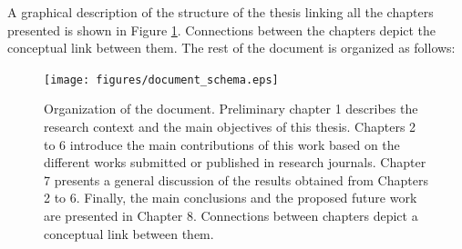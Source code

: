 A graphical description of the structure of the thesis linking all the chapters presented is shown in Figure \ref{document_structure}. Connections between the chapters depict the conceptual link between them. The rest of the document is organized as follows:

\begin{figure}[top]
  \begin{center}
    \texttt{[image: figures/document\_schema.eps]}
  \end{center}
    \caption[Organization of the document]{Organization of the document. Preliminary chapter 1 describes the research context and the main objectives of this thesis. Chapters 2 to 6 introduce the main contributions of this work based on the different works submitted or published in research journals. Chapter 7 presents a general discussion of the results obtained from Chapters 2 to 6. Finally, the main conclusions and the proposed future work are presented in Chapter 8. Connections between chapters depict a conceptual link between them.}
    \label{document_structure}
\end{figure}


